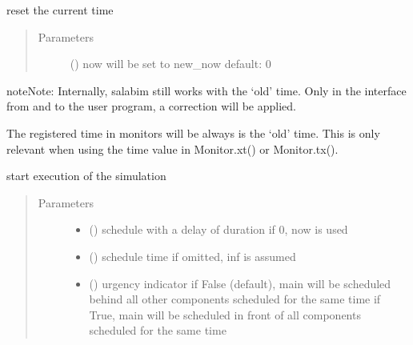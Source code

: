 \documentclass[letterpaper,10pt,english]{sphinxmanual}
\begin{document}
\begin{fulllineitems}

\begin{fulllineitems}
\label{\detokenize{Reference:salabim.Environment.reset_now}}
reset the current time
\begin{quote}\begin{description}
\item[{Parameters}] \leavevmode
{} () \textendash{} now will be set to new\_now 
default: 0

\end{description}\end{quote}

\begin{sphinxadmonition}{note}{Note:}
Internally, salabim still works with the ‘old’ time. Only in the interface
from and to the user program, a correction will be applied.

The registered time in monitors will be always is the ‘old’ time.
This is only relevant when using the time value in Monitor.xt() or Monitor.tx().
\end{sphinxadmonition}

\end{fulllineitems}


\begin{fulllineitems}
\label{\detokenize{Reference:salabim.Environment.run}}
start execution of the simulation
\begin{quote}\begin{description}
\item[{Parameters}] \leavevmode\begin{itemize}
\item {} 
 () \textendash{} schedule with a delay of duration 
if 0, now is used

\item {} 
 () \textendash{} schedule time 
if omitted, inf is assumed

\item {} 
 () \textendash{} urgency indicator 
if False (default), main will be scheduled
behind all other components scheduled
for the same time 
if True, main will be scheduled
in front of all components scheduled
for the same time


\end{itemize}
\end{description}
\end{quote}
\end{fulllineitems}
\end{fulllineitems}
\end{document}
